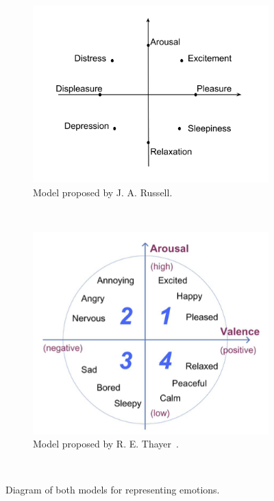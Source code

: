 \begin{figure}[b]
        \centering
        \begin{subfigure}[b]{0.47\textwidth}
                \includegraphics[width=\textwidth]{Figures/Russell}
                \caption{Model proposed by J. A. Russell.}
                \label{fig:Russell}
        \end{subfigure}%
        ~ %
        \begin{subfigure}[b]{0.47\textwidth}
                \includegraphics[width=\textwidth]{Figures/ThayersAV}
                \caption{Model proposed by R. E. Thayer~\cite{mood}.}
                \label{fig:Thayer}
        \end{subfigure}
          \caption{Diagram of both models for representing emotions.}
        ~ %
        \label{fig:RussellThayer}
\end{figure}



